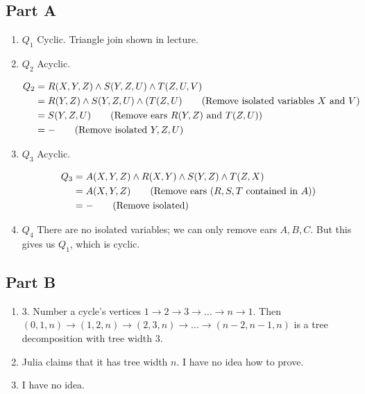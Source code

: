 \documentclass{article}
\begin{document}
\subsection{Part A}

\begin{enumerate}[label = {\arabic*)}]
    \item $Q_1$ Cyclic. Triangle join shown in lecture.
    \item $Q_2$ Acyclic.

        \begin{align*}
            Q_2 &= R(X, Y, Z) \wedge S(Y, Z, U) \wedge T(Z, U, V) \\
                &= R(Y, Z) \wedge S(Y, Z, U) \wedge (T(Z, U) \tag{Remove isolated variables $X$ and $V$} \\
                &= S(Y, Z, U) \tag{Remove ears $R(Y, Z)$ and $T(Z, U)$} \\
                &= - \tag{Remove isolated $Y, Z, U$}
        \end{align*}

    \item $Q_3$ Acyclic.

        \begin{align*}
            Q_3 &= A(X, Y, Z) \wedge R(X, Y) \wedge S(Y, Z) \wedge T(Z, X) \\
                &= A(X, Y, Z) \tag{Remove ears ($R, S, T$ contained in $A$)} \\
                &= - \tag{Remove isolated}
        \end{align*}

    \item $Q_4$ There are no isolated variables; we can only remove ears $A, B,
        C$. But this gives us $Q_1$, which is cyclic.
\end{enumerate}

\subsection{Part B}

\begin{enumerate}
    \item 3. Number a cycle's vertices $1 \to 2 \to 3 \to \ldots \to n \to 1$.
        Then $(0, 1, n) \to (1, 2, n) \to (2, 3, n) \to \ldots \to (n-2, n-1,
        n)$ is a tree decomposition with tree width $3$.
    \item Julia claims that it has tree width $n$. I have no idea how to prove.
    \item I have no idea.
\end{enumerate}
\end{document}
